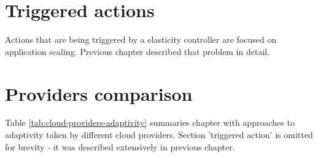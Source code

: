 \section{Triggered actions}
Actions that are being triggered by a elasticity controller are focused on application scaling. Previous chapter described that problem in detail.

\section{Providers comparison}

Table \ref{tab:cloud-providers-adaptivity} summaries chapter with approaches to adaptivity taken by different cloud providers. Section 'triggered action' is omitted for brevity - it was described extensively in previous chapter.


